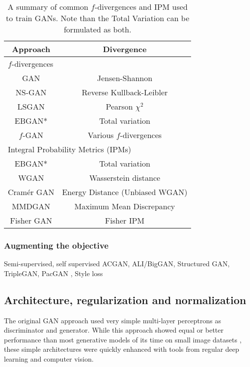 \begin{table}
	\centering
	\begin{tabular}{|c c|}
		\hline
		Approach & Divergence \\
		\hline 
		\multicolumn{2}{|l|}{$f$-divergences} \\
		\hline
		GAN \citep{Goodfellow2014}& Jensen-Shannon \\
		NS-GAN \citep{Goodfellow2014} & Reverse Kullback-Leibler \\
		LSGAN \citep{Mao2017}& Pearson $\chi^2$ \\
		EBGAN* \citep{Zhao2017} & Total variation \\
		$f$-GAN \citep{Nowozin2016} & Various $f$-divergences\\
		\hline 
		\multicolumn{2}{|l|}{Integral Probability Metrics (\ac{IPM}s)}\\
		\hline
		EBGAN* \citep{Zhao2017} & Total variation \\
		WGAN \citep{Arjovsky2017}& Wasserstein distance \\
		Cramér GAN \citep{Bellemare2017}& Energy Distance (Unbiased WGAN) \\
		MMDGAN \citep{Li2017a}& Maximum Mean Discrepancy \\				
		Fisher GAN\citep{Mroueh2017}& Fisher IPM \\
		\hline
	\end{tabular}
	\label{table:divergences}
	\caption[Summary of common $f$-divergences and \ac{IPM} used to train GANs]{A summary of common $f$-divergences and \ac{IPM} used to train GANs. Note than the Total Variation can be formulated as both.}
\end{table}


\subsubsection{Augmenting the objective}
\label{subs:augmented_objectives}

Semi-supervised, self supervised
ACGAN, ALI/BigGAN, Structured GAN, TripleGAN,  PacGAN , Style loss



\subsection{Architecture, regularization and normalization}

The original GAN approach \citep{Goodfellow2014} used very simple multi-layer perceptrons as discriminator and generator. While this approach showed equal or better performance than most generative models of its time \citep{Kingma2014b,Bengio2014} on small image datasets \citep{LeCun1998a, Krizhevsky2009}, these simple architectures were quickly enhanced with tools from regular deep learning and computer vision.

